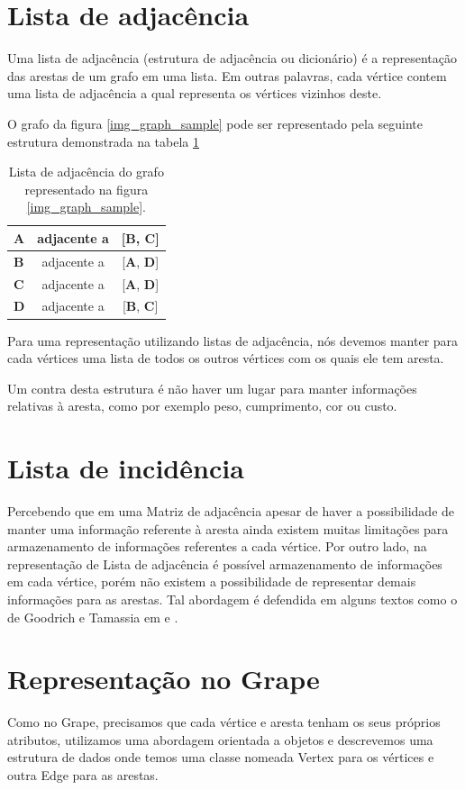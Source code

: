 \documentclass[a4paper]{abnt}
\begin{document}
\section{Lista de adjacência}
Uma lista de adjacência (estrutura de adjacência ou dicionário) é a representação das arestas de um grafo em uma lista. Em outras palavras, cada vértice contem uma lista de adjacência a qual representa os vértices vizinhos deste.

O grafo da figura \ref{img_graph_sample} pode ser representado pela seguinte estrutura demonstrada na tabela \ref{tab_adj_list}

\begin{table}[H]
        \centering
        \begin{tabular}{|l|c|c|} \hline
		\textbf{A}  & adjacente a   & [\textbf{B}, \textbf{C}] \\ \hline \hline
		\textbf{B}	& adjacente a   & [\textbf{A}, \textbf{D}] \\ \hline \hline
		\textbf{C}	& adjacente a   & [\textbf{A}, \textbf{D}] \\ \hline \hline
		\textbf{D}	& adjacente a   & [\textbf{B}, \textbf{C}] \\ \hline
        \end{tabular}
        \caption{Lista de adjacência do grafo representado na figura \ref{img_graph_sample}.}
\label{tab_adj_list}
\end{table}
Para uma representação utilizando listas de adjacência, nós devemos manter para cada vértices uma lista de todos os outros vértices com os quais ele tem aresta.

Um contra desta estrutura é não haver um lugar para manter informações relativas à aresta, como por exemplo peso, cumprimento, cor ou custo.

\section{Lista de incidência}
Percebendo que em uma Matriz de adjacência apesar de haver a possibilidade de manter uma informação referente à aresta ainda existem muitas limitações para armazenamento de informações referentes a cada vértice. Por outro lado, na representação de Lista de adjacência é possível armazenamento de informações em cada vértice, porém não existem a possibilidade de representar demais informações para as arestas. Tal abordagem é defendida em alguns textos como o de Goodrich e Tamassia em \cite{tamassia} e \cite{goodrich}.

\section{Representação no Grape}
Como no Grape, precisamos que cada vértice e aresta tenham os seus próprios atributos, utilizamos uma abordagem orientada a objetos e descrevemos uma estrutura de dados onde temos uma classe nomeada Vertex para os vértices e outra Edge para as arestas.
\end{document}
